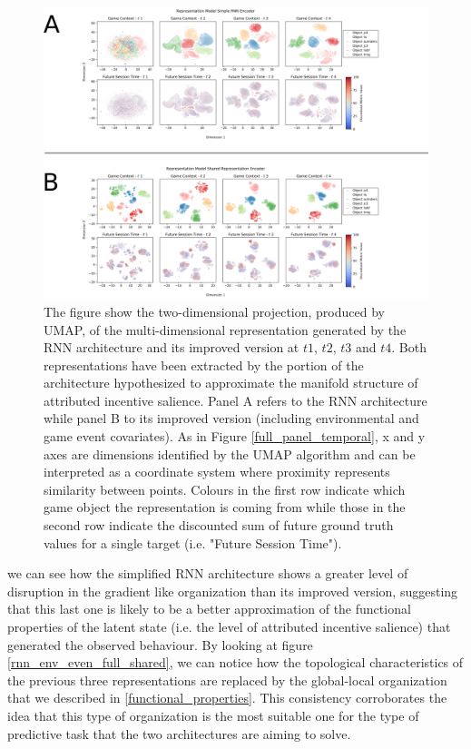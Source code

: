 \begin{figure}[ht]
\centering
\includegraphics[width=\textwidth]{images/chapter_4/rnn_predictive.png}
\caption[\textbf{Differences in predictive power between the representations generated by the RNN architecture and its improved version}]{The figure show the two-dimensional projection, produced by UMAP, of the multi-dimensional representation generated by the RNN architecture and its improved version at $t1$, $t2$, $t3$ and $t4$. Both representations have been extracted by the portion of the architecture hypothesized to approximate the manifold structure of attributed incentive salience. Panel A refers to the RNN architecture while panel B to its improved version (including environmental and game event covariates). As in Figure \ref{full_panel_temporal}, x and y axes are dimensions identified by the UMAP algorithm and can be interpreted as a coordinate system where proximity represents similarity between points. Colours in the first row indicate which game object the representation is coming from while those in the second row indicate the discounted sum of future ground truth values for a single target (i.e. "Future Session Time").}
\label{rnn_predictive_comparison}
\end{figure}

we can see how the simplified RNN architecture shows a greater level of disruption in the gradient like organization than its improved version, suggesting that this last one is likely to be a better approximation of the functional properties of the latent state (i.e. the level of attributed incentive salience) that generated the observed behaviour. By looking at figure \ref{rnn_env_even_full_shared}, we can notice how the topological characteristics of the previous three representations are replaced by the global-local organization that we described in \ref{functional_properties}. This consistency corroborates the idea that this type of organization is the most suitable one for the type of predictive task that the two architectures are aiming to solve.

